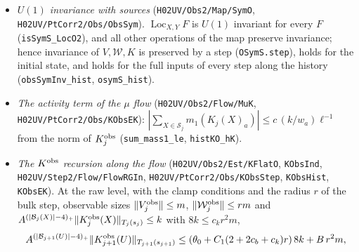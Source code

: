 \documentclass[11pt]{amsart}
\theoremstyle{definition}
\theoremstyle{remark}
\numberwithin{equation}{section}
\newcommand{\cS}{\mathcal{S}}
\newcommand{\Loc}{\operatorname{Loc}}
\begin{document}
\begin{itemize}
  \texttt{LinBoundOL}, \texttt{BlockO6}, \texttt{Step2OL}, \texttt{Step3O}, \texttt{Step3OL}, \texttt{StepKO}, \texttt{KObs4W}).
  Under the strong locality of the inputs, $\sum_{U\supseteq B_+}J(B_+,U)=0$ with sources (\texttt{JhO\_sum\_U}), so
  $K_{j+1}(U)=K^\sharp_{j+1}(U)+\sum_{\mathcal R}R_g(U)$ (\texttt{KoutO\_split}); the correction is bounded in any
  submultiplicative norm (\texttt{KoutO\_sub\_le}). With the output regulator $\lambda A$ in the second-order step
  (\texttt{step2O\_tsL}, \texttt{step3OL}) and the full-norm bounds $\|\tilde I_{j+1}(B_+)\|\le2$, $\|\bar J\|\le C r^2$
  ($r=\max(\bar g,k)$; \texttt{ItO\_full}, \texttt{JhO\_full}):
  \[A^{(|\mathcal B_{j+1}(U)|-2^d)_+}\|K_{j+1}(U)\|_{T_{j+1}(\ell')}\le C_0(L^{d-3}+A^{-\eta})k+C_1(\bar g^3+\bar gk+k^2)\]
  in the full norm with sources (\texttt{stepKO\_ts}), and in the $\lambda$-norm
  $A^{(\cdots)_+}\|K_{j+1}^{\rm obs}\|\le(\theta_0+O(\bar g))k+B\bar g^2m$ (\texttt{kobsK\_stepW} with $\mu=1$): the $k$-half of the
  linear recursion of \texttt{lin\_iter}; also with input regulator $A$ and output regulator $\mu A$ (\texttt{stepKO\_tsW}, \texttt{kobsK\_stepW}), the form used along the flow.
\item \emph{$U(1)$ invariance with sources} (\texttt{H02UV/Obs2/Map/SymO}, \texttt{H02UV/PtCorr2/Obs/ObsSym}). $\Loc_{X,Y}F$ is $U(1)$ invariant for
  every $F$ (\texttt{isSymS\_LocO2}), and all other operations of the map preserve invariance; hence invariance of
  $V,\mathcal W,K$ is preserved by a step (\texttt{OSymS.step}), holds for the initial state, and holds for the full inputs of
  every step along the history (\texttt{obsSymInv\_hist}, \texttt{osymS\_hist}).
\item \emph{The activity term of the $\mu$ flow} (\texttt{H02UV/Obs2/Flow/MuK}, \texttt{H02UV/PtCorr2/Obs/KObsEK}):
  $|\sum_{X\in\cS_j}m_1(K_j(X)_a)|\le c\,(k/w_a)\ell^{-1}$ from the norm of $K^{\rm obs}_j$ (\texttt{sum\_mass1\_le},
  \texttt{histKO\_hK}).
\item \emph{The $K^{\rm obs}$ recursion along the flow} (\texttt{H02UV/Obs2/Est/KFlatO}, \texttt{KObsInd}, \texttt{H02UV/Step2/Flow/FlowRGIn},
  \texttt{H02UV/PtCorr2/Obs/KObsStep}, \texttt{KObsHist}, \texttt{KObsEK}). At the raw level, with the clamp conditions and the radius
  $r$ of the bulk step, observable sizes $\|V^{\rm obs}_j\|\le m$, $\|\mathcal W^{\rm obs}_j\|\le rm$ and
  $A^{(|\mathcal B_j(X)|-4)_+}\|K^{\rm obs}_j(X)\|_{T_j(s_j)}\le k$ with $8k\le c_kr^2m$,
  \[A^{(|\mathcal B_{j+1}(U)|-4)_+}\|K^{\rm obs}_{j+1}(U)\|_{T_{j+1}(s_{j+1})}\le(\theta_0+C_1(2+2c_b+c_k)r)\,8k+B\,r^2m,\]

\end{itemize}
\end{document}
